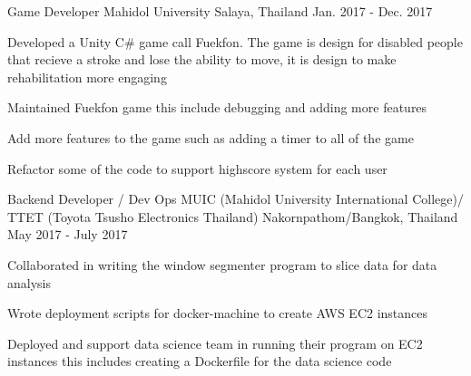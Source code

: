 

\begin{cventries}

  \cventry
    {Game Developer} %
    {Mahidol University} %
    {Salaya, Thailand} %
    {Jan. 2017 - Dec. 2017} %
    {
      \begin{cvitems} %
        \item {Developed a Unity C\# game call Fuekfon. The game is design for disabled people that recieve a stroke and lose the ability to move, it is design to make rehabilitation more engaging}
        \item {Maintained Fuekfon game this include debugging and adding more features}
        \item {Add more features to the game such as adding a timer to all of the game}
        \item {Refactor some of the code to support highscore system for each user}
      \end{cvitems}
    }


  \cventry
    {Backend Developer / Dev Ops} %
    {MUIC (Mahidol University International College)/ TTET (Toyota Tsusho Electronics Thailand)} %
    {Nakornpathom/Bangkok, Thailand} %
    {May 2017 - July 2017} %
    {
      \begin{cvitems} %
        \item {Collaborated in writing the window segmenter program to slice data for data analysis}
        \item {Wrote deployment scripts for docker-machine to create AWS EC2 instances}
        \item {Deployed and support data science team in running their program on EC2 instances this includes creating a Dockerfile for the data science code}
      \end{cvitems}
    }



\end{cventries}
